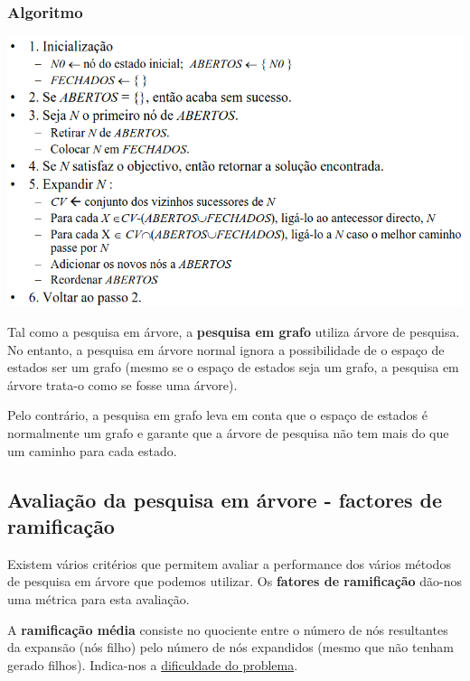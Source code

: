 \documentclass{article}
\begin{document}
\subsubsection{Algoritmo}

\begin{center}
  \includegraphics[scale=0.38]{55}
\end{center}

\pagebreak

Tal como a pesquisa em árvore, a \textbf{pesquisa em grafo} utiliza
árvore de pesquisa. No entanto, a pesquisa em árvore normal ignora a
possibilidade de o espaço de estados ser um grafo (mesmo se o espaço
de estados seja um grafo, a pesquisa em árvore trata-o como se fosse uma árvore).

Pelo contrário, a pesquisa em grafo leva em conta que
o espaço de estados é normalmente um grafo e garante
que a árvore de pesquisa não tem mais do que um
caminho para cada estado.

\subsection{Avaliação da pesquisa em árvore
- factores de ramificação}

Existem vários critérios que permitem avaliar a performance dos vários métodos de pesquisa
em árvore que podemos utilizar. Os \textbf{fatores de ramificação} dão-nos uma métrica para esta
avaliação.

\vspace{2mm}

A \textbf{ramificação média} consiste no quociente entre o número de nós resultantes da expansão
(nós filho) pelo número de nós expandidos (mesmo que não tenham gerado filhos). Indica-nos a
\uline{dificuldade do problema}.
\end{document}
